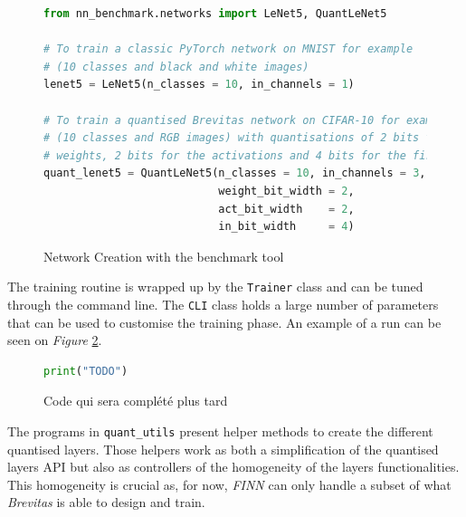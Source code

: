 

\begin{figure}[htbp]
\centering
\begin{lstlisting}[language=Python]
from nn_benchmark.networks import LeNet5, QuantLeNet5

# To train a classic PyTorch network on MNIST for example
# (10 classes and black and white images)
lenet5 = LeNet5(n_classes = 10, in_channels = 1)

# To train a quantised Brevitas network on CIFAR-10 for example
# (10 classes and RGB images) with quantisations of 2 bits for the
# weights, 2 bits for the activations and 4 bits for the first layer
quant_lenet5 = QuantLeNet5(n_classes = 10, in_channels = 3,
                           weight_bit_width = 2,
                           act_bit_width    = 2,
                           in_bit_width     = 4)
\end{lstlisting}
\caption[NetworkCreation]{Network Creation with the benchmark tool}
	\label{fig:NetworkCreation}
\end{figure}


The training routine is wrapped up by the \texttt{Trainer} class and can be tuned through the command line. The \texttt{CLI} class holds a large number of parameters that can be used to customise the training phase. An example of a run can be seen on \emph{Figure} \ref{fig:BenchCLI}.

\begin{figure}[htbp]
	\centering
	\begin{lstlisting}[language=Python]
print("TODO")\end{lstlisting}
	\caption[Exemple]{Code qui sera complété plus tard}
	\label{fig:BenchCLI}
\end{figure}

The programs in \texttt{quant\_utils\/} present helper methods to create the different quantised layers. Those helpers work as both a simplification of the quantised layers API but also as controllers of the homogeneity of the layers functionalities. This homogeneity is crucial as, for now, \emph{FINN} can only handle a subset of what \emph{Brevitas} is able to design and train.

